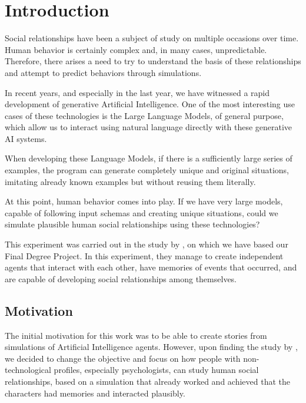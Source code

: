 \chapter*{Introduction}
\label{cap:introduction}


Social relationships have been a subject of study on multiple occasions over time. Human behavior is certainly complex and, in many cases, unpredictable. Therefore, there arises a need to try to understand the basis of these relationships and attempt to predict behaviors through simulations.

In recent years, and especially in the last year, we have witnessed a rapid development of generative Artificial Intelligence. One of the most interesting use cases of these technologies is the Large Language Models, of general purpose, which allow us to interact using natural language directly with these generative AI systems.

When developing these Language Models, if there is a sufficiently large series of examples, the program can generate completely unique and original situations, imitating already known examples but without reusing them literally.

At this point, human behavior comes into play. If we have very large models, capable of following input schemas and creating unique situations, could we simulate plausible human social relationships using these technologies?

This experiment was carried out in the study by \cite{park2023generative}, on which we have based our Final Degree Project. In this experiment, they manage to create independent agents that interact with each other, have memories of events that occurred, and are capable of developing social relationships among themselves.

\section{Motivation}
The initial motivation for this work was to be able to create stories from simulations of Artificial Intelligence agents. However, upon finding the study by \ga \citep{park2023generative}, we decided to change the objective and focus on how people with non-technological profiles, especially psychologists, can study human social relationships, based on a simulation that already worked and achieved that the characters had memories and interacted plausibly.

